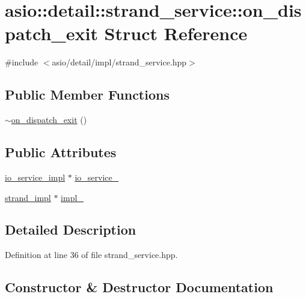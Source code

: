 \hypertarget{structasio_1_1detail_1_1strand__service_1_1on__dispatch__exit}{}\section{asio\+:\+:detail\+:\+:strand\+\_\+service\+:\+:on\+\_\+dispatch\+\_\+exit Struct Reference}
\label{structasio_1_1detail_1_1strand__service_1_1on__dispatch__exit}


{\ttfamily \#include $<$asio/detail/impl/strand\+\_\+service.\+hpp$>$}

\subsection*{Public Member Functions}
\begin{DoxyCompactItemize}
\item 
\hyperlink{structasio_1_1detail_1_1strand__service_1_1on__dispatch__exit_ab59d1c9b77dd4261c1d7f1aa8490b4d4}{$\sim$on\+\_\+dispatch\+\_\+exit} ()
\end{DoxyCompactItemize}
\subsection*{Public Attributes}
\begin{DoxyCompactItemize}
\item 
\hyperlink{namespaceasio_1_1detail_a6d61d9b8e53c11288be549d82aec5a42}{io\+\_\+service\+\_\+impl} $\ast$ \hyperlink{structasio_1_1detail_1_1strand__service_1_1on__dispatch__exit_a46671ac362e866934893479b329ea4ff}{io\+\_\+service\+\_\+}
\item 
\hyperlink{classasio_1_1detail_1_1strand__service_1_1strand__impl}{strand\+\_\+impl} $\ast$ \hyperlink{structasio_1_1detail_1_1strand__service_1_1on__dispatch__exit_a5205330dc1024019a4236eb2712fe2b0}{impl\+\_\+}
\end{DoxyCompactItemize}


\subsection{Detailed Description}


Definition at line 36 of file strand\+\_\+service.\+hpp.



\subsection{Constructor \& Destructor Documentation}
\hypertarget{structasio_1_1detail_1_1strand__service_1_1on__dispatch__exit_ab59d1c9b77dd4261c1d7f1aa8490b4d4}{}
